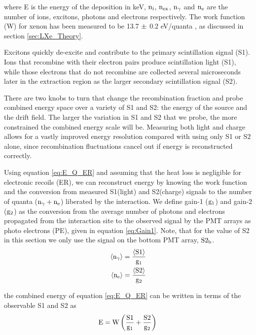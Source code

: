 \noindent where E is the energy of the deposition in keV, $\rm n_i$, $\rm n_{ex}$, $\rm n_\gamma$ and $\rm n_e$ are the number of ions, excitons, photons and electrons respectively. The work function (W) for xenon has been measured to be 13.7 $\rm \pm$ 0.2  eV/quanta  \cite{Dahl_Thesis}, as discussed in section \ref{sec:LXe_Theory}. 

Excitons quickly de-excite and contribute to the primary scintillation signal (S1). Ions that recombine with their electron pairs produce scintillation light (S1), while those electrons that do not recombine are collected several microseconds later in the extraction region as the larger secondary scintillation signal (S2).


There are two knobs to turn that change the recombination fraction and probe combined energy space over a variety of S1 and S2: the energy of the source and the drift field. The larger the variation in S1 and S2 that we probe, the more constrained the combined energy scale will be. Measuring both light and charge allows for a vastly improved energy resolution compared with using only S1 or S2 alone, since recombination fluctuations cancel out if energy is reconstructed correctly.

Using equation \ref{eq:E_Q_ER} and assuming that the heat loss is negligible for electronic recoils (ER), we can reconstruct energy by knowing the work function and the conversion from measured S1(light) and S2(charge) signals to the number of quanta ($\rm n_\gamma + n_e$) liberated by the interaction. We define gain-1 ($\rm g_1$) and gain-2 ($\rm g_2$) as the conversion from the average number of photons and electrons propagated from the interaction site to the observed signal by the PMT arrays as photo electrons (PE), given in equation \ref{eq:Gain1}. Note, that for the value of S2 in this section we only use the signal on the bottom PMT array, $\rm S2_b$.
\begin{equation}
\begin{split}
\rm  \left<n_\gamma\right> = \frac{\left<S1\right>}{g_1}\\
\rm \left<n_{e}\right> = \frac{\left<S2\right>}{g_2}
\label{eq:Gain1}
\end{split}
\end{equation}

\noindent the combined energy of equation \ref{eq:E_Q_ER} can be written in terms of the observable S1 and S2 as
\begin{equation}
\rm E= W \left(\frac{S1}{g_1}+ \frac{S2}{g_2}\right) \\
\label{eq:E_S1S2}
\end{equation}



